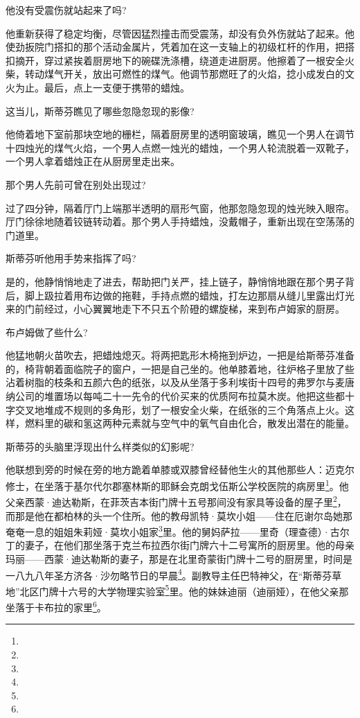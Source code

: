 \par 他没有受震伤就站起来了吗?
\par 他重新获得了稳定均衡，尽管因猛烈撞击而受震荡，却没有负外伤就站了起来。他使劲扳院门搭扣的那个活动金属片，凭着加在这一支轴上的初级杠杆的作用，把搭扣摘开，穿过紧挨着厨房地下的碗碟洗涤槽，绕道走进厨房。他擦着了一根安全火柴，转动煤气开关，放出可燃性的煤气。他调节那燃旺了的火焰，捻小成发白的文火为止。最后，点上一支便于携带的蜡烛。
\par 这当儿，斯蒂芬瞧见了哪些忽隐忽现的影像?
\par 他倚着地下室前那块空地的栅栏，隔着厨房里的透明窗玻璃，瞧见一个男人在调节十四烛光的煤气火焰，一个男人点燃一烛光的蜡烛，一个男人轮流脱着一双靴子，一个男人拿着蜡烛正在从厨房里走出来。
\par 那个男人先前可曾在别处出现过?
\par 过了四分钟，隔着厅门上端那半透明的扇形气窗，他那忽隐忽现的烛光映入眼帘。厅门徐徐地随着铰链转动着。那个男人手持蜡烛，没戴帽子，重新出现在空荡荡的门道里。
\par 斯蒂芬听他用手势来指挥了吗?
\par 是的，他静悄悄地走了进去，帮助把门关严，挂上链子，静悄悄地跟在那个男子背后，脚上趿拉着用布边做的拖鞋，手持点燃的蜡烛，打左边那扇从缝儿里露出灯光来的门前经过，小心翼翼地走下不只五个阶磴的螺旋梯，来到布卢姆家的厨房。
\par 布卢姆做了些什么?
\par 他猛地朝火苗吹去，把蜡烛熄灭。将两把匙形木椅拖到炉边，一把是给斯蒂芬准备的，椅背朝着面临院子的窗户，一把是自己坐的。他单膝着地，往炉格子里放了些沾着树脂的枝条和五颜六色的纸张，以及从坐落于多利埃街十四号的弗罗尔与麦唐纳公司的堆置场以每吨二十一先令的代价买来的优质阿布拉莫木炭。他把这些都十字交叉地堆成不规则的多角形，划了一根安全火柴，在纸张的三个角落点上火。这样，燃料里的碳和氢这两种元素就与空气中的氧气自由化合，散发出潜在的能量。
\par 斯蒂芬的头脑里浮现出什么样类似的幻影呢?
\par 他联想到旁的时候在旁的地方跪着单膝或双膝曾经替他生火的其他那些人：迈克尔修士，在坐落于基尔代尔郡塞林斯的耶稣会克朗戈伍斯公学校医院的病房里\footnote{}。他父亲西蒙·迪达勒斯，在菲茨吉本街门牌十五号那间没有家具等设备的屋子里\footnote{}，而那是他在都柏林的头一个住所。他的教母凯特·莫坎小姐——住在厄谢尔岛她那奄奄一息的姐姐朱莉娅·莫坎小姐家\footnote{}里。他的舅妈萨拉——里奇（理查德）·古尔丁的妻子，在他们那坐落于克兰布拉西尔街门牌六十二号寓所的厨房里。他的母亲玛丽——西蒙·迪达勒斯的妻子，那是在北里奇蒙街门牌十二号的厨房里，时间是一八九八年圣方济各·沙勿略节日的早晨\footnote{}。副教导主任巴特神父，在“斯蒂芬草地”北区门牌十六号的大学物理实验室\footnote{}里。他的妹妹迪丽（迪丽娅），在他父亲那坐落于卡布拉的家里\footnote{}。
